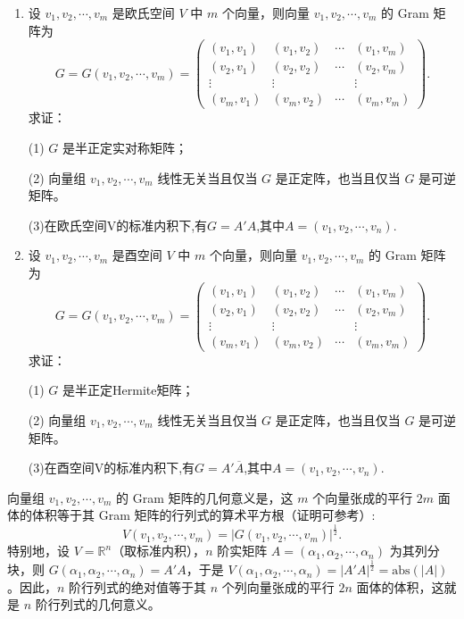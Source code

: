 \documentclass[../../main.tex]{subfiles}
\begin{document}
\begin{proposition}[Gram阵的性质]\label{proposition:欧氏空间中Gram阵的性质-例9.5}
\begin{enumerate}
\item 设 $v_1,v_2,\cdots,v_m$ 是欧氏空间 $V$ 中 $m$ 个向量，则向量 $v_1,v_2,\cdots,v_m$ 的 Gram 矩阵为
\[
G = G(v_1,v_2,\cdots,v_m)=\begin{pmatrix}
(v_1,v_1) & (v_1,v_2) & \cdots & (v_1,v_m)\\
(v_2,v_1) & (v_2,v_2) & \cdots & (v_2,v_m)\\
\vdots & \vdots & & \vdots\\
(v_m,v_1) & (v_m,v_2) & \cdots & (v_m,v_m)
\end{pmatrix}.
\]
求证：

(1) $G$ 是半正定实对称矩阵；

(2) 向量组 $v_1,v_2,\cdots,v_m$ 线性无关当且仅当 $G$ 是正定阵，也当且仅当 $G$ 是可逆矩阵。

(3)在欧氏空间V的标准内积下,有$G=A'A$,其中$A=(v_1,v_2,\cdots,v_n)$.

\item 设 $v_1,v_2,\cdots,v_m$ 是酉空间 $V$ 中 $m$ 个向量，则向量 $v_1,v_2,\cdots,v_m$ 的 Gram 矩阵为
\[
G = G(v_1,v_2,\cdots,v_m)=\begin{pmatrix}
(v_1,v_1) & (v_1,v_2) & \cdots & (v_1,v_m)\\
(v_2,v_1) & (v_2,v_2) & \cdots & (v_2,v_m)\\
\vdots & \vdots & & \vdots\\
(v_m,v_1) & (v_m,v_2) & \cdots & (v_m,v_m)
\end{pmatrix}.
\]
求证：

(1) $G$ 是半正定Hermite矩阵；

(2) 向量组 $v_1,v_2,\cdots,v_m$ 线性无关当且仅当 $G$ 是正定阵，也当且仅当 $G$ 是可逆矩阵。

(3)在酉空间V的标准内积下,有$G=A'\overline{A}$,其中$A=(v_1,v_2,\cdots,v_n)$.
\end{enumerate}
\end{proposition}
\begin{remark}
向量组 $v_1,v_2,\cdots,v_m$ 的 Gram 矩阵的几何意义是，这 $m$ 个向量张成的平行 $2m$ 面体的体积等于其 Gram 矩阵的行列式的算术平方根（证明可参考）:
\[
V(v_1,v_2,\cdots,v_m)=|G(v_1,v_2,\cdots,v_m)|^{\frac{1}{2}}.
\]
特别地，设 $V = \mathbb{R}^n$（取标准内积），$n$ 阶实矩阵 $A = (\alpha_1,\alpha_2,\cdots,\alpha_n)$ 为其列分块，则 $G(\alpha_1,\alpha_2,\cdots,\alpha_n)=A'A$，于是 $V(\alpha_1,\alpha_2,\cdots,\alpha_n)=|A'A|^{\frac{1}{2}}=\text{abs}(|A|)$。因此，$n$ 阶行列式的绝对值等于其 $n$ 个列向量张成的平行 $2n$ 面体的体积，这就是 $n$ 阶行列式的几何意义。 
\end{remark}
\end{document}

